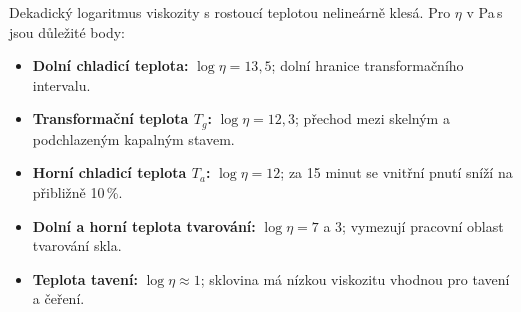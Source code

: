 Dekadický logaritmus viskozity s rostoucí teplotou nelineárně klesá. Pro $\eta$ v Pa\,s jsou důležité body:
\begin{itemize}
\item \textbf{Dolní chladicí teplota:} $\log\eta=13{,}5$; dolní hranice transformačního intervalu.
\item \textbf{Transformační teplota $T_g$:} $\log\eta=12{,}3$; přechod mezi skelným a podchlazeným kapalným stavem.
\item \textbf{Horní chladicí teplota $T_a$:} $\log\eta=12$; za 15 minut se vnitřní pnutí sníží na přibližně 10\,\%.
\item \textbf{Dolní a horní teplota tvarování:} $\log\eta=7$ a $3$; vymezují pracovní oblast tvarování skla.
\item \textbf{Teplota tavení:} $\log\eta\approx1$; sklovina má nízkou viskozitu vhodnou pro tavení a čeření.
\end{itemize}
